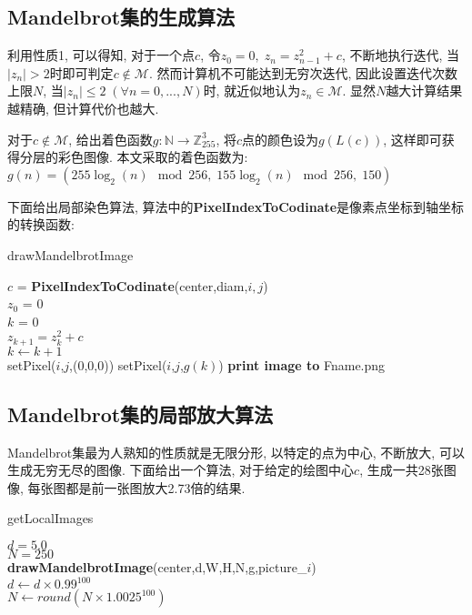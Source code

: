 \documentclass[UTF8]{ctexart}
\begin{document}
\subsection{Mandelbrot集的生成算法}

利用性质1, 可以得知, 对于一个点$c$, 令$z_0=0,\;z_n=z_{n-1}^2+c$, 不断地执行迭代, 当$|z_n|>2$时即可判定$c\notin \mathcal{M}$. 然而计算机不可能达到无穷次迭代, 因此设置迭代次数上限$N$, 当$|z_n|\leq 2\;(\forall n=0,...,N)$时, 就近似地认为$z_n\in \mathcal{M}$. 显然$N$越大计算结果越精确, 但计算代价也越大. 

对于$c\notin \mathcal{M}$, 给出着色函数$g:\mathbb{N} \to \mathbb{Z}_{255}^3$, 将$c$点的颜色设为$g(L(c))$, 这样即可获得分层的彩色图像. 本文采取的着色函数为: $g(n)=(255\log_2(n)\mod 256,\;155\log_2(n)\mod 256,\;150)$

下面给出局部染色算法, 算法中的\textbf{PixelIndexToCodinate}是像素点坐标到轴坐标的转换函数: 

\begin{algorithm}[H]
	\caption{drawMandelbrotImage}
	\small
	
	{
        {
            $c$ = \textbf{PixelIndexToCodinate}(center,diam,$i,j$)\\
            $z_0$ = 0\\
            $k$ = 0\\
            {
                $z_{k+1}=z_k^2+c$\\
                $k\gets k+1$\\
            }
            {
                setPixel($i$,$j$,(0,0,0))
            }
            {
                setPixel($i$,$j$,$g(k)$)
            }
        }
	}
    \textbf{print image to} Fname.png
\end{algorithm}

\subsection{Mandelbrot集的局部放大算法}

Mandelbrot集最为人熟知的性质就是无限分形, 以特定的点为中心, 不断放大, 可以生成无穷无尽的图像. 下面给出一个算法, 对于给定的绘图中心$c$, 生成一共28张图像, 每张图都是前一张图放大2.73倍的结果. 

\begin{algorithm}[H]
	\caption{getLocalImages}
	\small
	
    $d=5.0$\\
    $N=250$\\
	{
        \textbf{drawMandelbrotImage}(center,d,W,H,N,g,picture\_$i$)\\
        $d\gets d \times 0.99^{100}$\\
        $N\gets round(N \times 1.0025^{100})$
	}
\end{algorithm}
\end{document}
